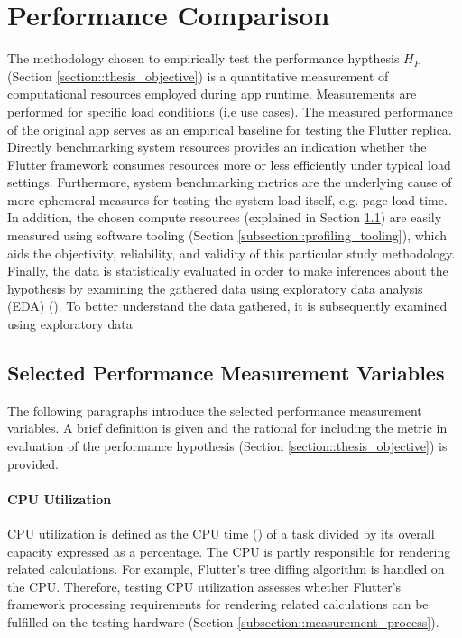 \section{Performance Comparison} \label{section::performance_comparison_design}
The methodology chosen to empirically test the performance hypthesis $H_P$ (Section \ref{section::thesis_objective}) is a quantitative
measurement of computational resources employed during app runtime. Measurements are performed for
specific load conditions (i.e use cases). 
The measured performance of the original app serves as an empirical baseline for testing the Flutter replica.\\
Directly benchmarking system resources provides an indication whether the Flutter framework consumes resources more or less efficiently under typical load settings. Furthermore, system
benchmarking metrics are the underlying cause of more ephemeral measures for testing the
system load itself, e.g. page load time. In addition, the chosen compute resources (explained
in Section \ref{subsection::selected_measurement_variables}) are easily measured using software tooling (Section \ref{subsection::profiling_tooling}), which aids the
objectivity, reliability, and validity of this particular study methodology.\\
Finally, the data is statistically evaluated in order to make inferences about the hypothesis by examining the gathered data using exploratory data analysis (EDA) (\cite{Tukey1977}).
To better understand the data gathered, it is subsequently examined using exploratory data

\subsection{Selected Performance Measurement Variables} \label{subsection::selected_measurement_variables}
The following paragraphs introduce the selected performance measurement variables. A brief definition is given and the rational for including the metric in
evaluation of the performance hypothesis (Section \ref{section::thesis_objective}) is provided.

\paragraph*{CPU Utilization}\label{paragraph::cpu_utilization}\hfill \break
CPU utilization is defined as the CPU time (\cite{FSF1988}) of a task
divided by its overall capacity expressed as a percentage. 
The CPU is partly responsible for rendering related calculations.
For example, Flutter's tree diffing algorithm is handled on the CPU.
Therefore, testing CPU utilization assesses whether Flutter's framework processing requirements for rendering related calculations can be fulfilled on the testing hardware (Section \ref{subsection::measurement_process}).

